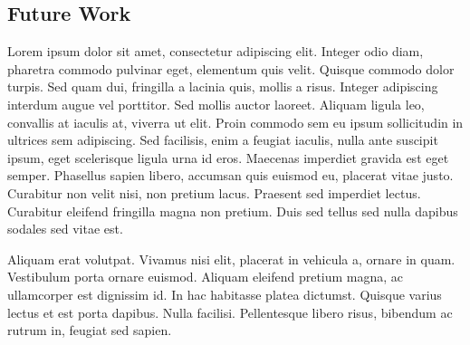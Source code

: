 \subsection{Future Work}
Lorem ipsum dolor sit amet, consectetur adipiscing elit. Integer odio diam, pharetra commodo pulvinar eget, elementum quis velit. Quisque commodo dolor turpis. Sed quam dui, fringilla a lacinia quis, mollis a risus. Integer adipiscing interdum augue vel porttitor. Sed mollis auctor laoreet. Aliquam ligula leo, convallis at iaculis at, viverra ut elit. Proin commodo sem eu ipsum sollicitudin in ultrices sem adipiscing. Sed facilisis, enim a feugiat iaculis, nulla ante suscipit ipsum, eget scelerisque ligula urna id eros. Maecenas imperdiet gravida est eget semper. Phasellus sapien libero, accumsan quis euismod eu, placerat vitae justo. Curabitur non velit nisi, non pretium lacus. Praesent sed imperdiet lectus. Curabitur eleifend fringilla magna non pretium. Duis sed tellus sed nulla dapibus sodales sed vitae est.

Aliquam erat volutpat. Vivamus nisi elit, placerat in vehicula a, ornare in quam. Vestibulum porta ornare euismod. Aliquam eleifend pretium magna, ac ullamcorper est dignissim id. In hac habitasse platea dictumst. Quisque varius lectus et est porta dapibus. Nulla facilisi. Pellentesque libero risus, bibendum ac rutrum in, feugiat sed sapien.


